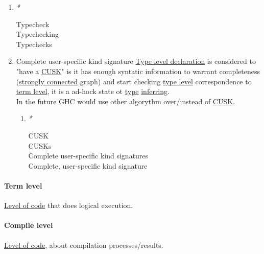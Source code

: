 \documentclass[11pt]{article}
\begin{document}
\begin{enumerate}
\item \emph{*}
\label{sec:org162a918}

\label{orgb66fa44}Typecheck\\
\label{org64d9d33}Typechecking\\
\label{org1f5fd94}Typechecks\\

\item \label{org87fa8a5}Complete user-specific kind signature
\label{sec:orgb4ed2ba}
\hyperref[org14351b4]{Type level declaration} is considered to "have a \hyperref[org2c75727]{CUSK}" is it has enough syntatic information to warrant completeness (\hyperref[org9753e4e]{strongly connected} graph) and start checking \hyperref[orgfe4cf3f]{type level} correspondence to \hyperref[org4d02774]{term level}, it is a ad-hock state ot \hyperref[orgc4aea2f]{type} \hyperref[org6183920]{inferring}.\\

In the future GHC would use other algorythm over/instead of \hyperref[org2c75727]{CUSK}.\\

\begin{enumerate}
\item \emph{*}
\label{sec:orgfe4a061}

\label{org2c75727}CUSK\\
\label{org9a79859}CUSKs\\
\label{orgaa6c7cc}Complete user-specific kind signatures\\
\label{org30026c1}Complete, user-specific kind signature\\
\end{enumerate}
\end{enumerate}

\paragraph{\label{org4d02774}Term level}
\label{sec:org23e9f4b}
\hyperref[org6ffbfd4]{Level of code} that does logical execution.\\

\paragraph{\label{org9c39e37}Compile level}
\label{sec:org490da34}
\hyperref[org6ffbfd4]{Level of code}, about compilation processes/results.\\
\end{document}
